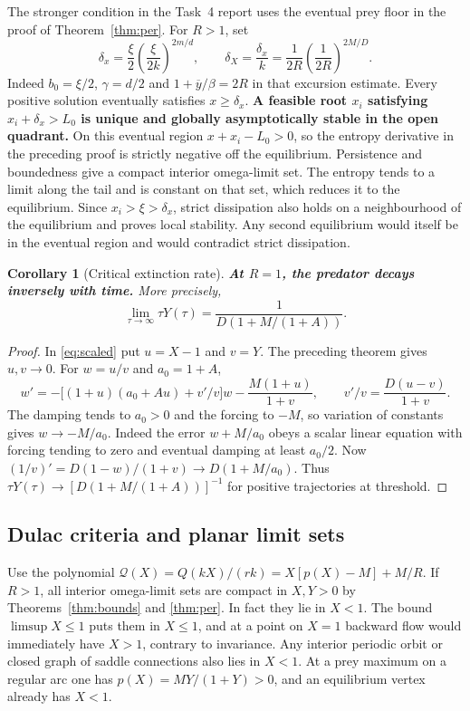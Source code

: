 \documentclass[12pt,a4paper,twoside,fleqn]{article}
\theoremstyle{journal}
\newtheorem{corollary}{Corollary}
\newcommand{\claim}[1]{{\normalfont\bfseries\boldmath #1}}
\newcommand{\Q}{\mathcal Q}
\begin{document}
The stronger condition in the Task~4 report uses the eventual prey floor in the proof of Theorem~\ref{thm:per}. For \(R>1\), set
\begin{equation}\label{eq:floorentropy}
 \delta_x=\frac{\xi}{2}\left(\frac{\xi}{2k}\right)^{2m/d},
 \qquad \delta_X=\frac{\delta_x}{k}
       =\frac{1}{2R}\left(\frac{1}{2R}\right)^{2M/D}.
\end{equation}
Indeed \(b_0=\xi/2\), \(\gamma=d/2\) and \(1+\overline y/\beta=2R\) in that excursion estimate. Every positive solution eventually satisfies \(x\ge\delta_x\).
\claim{A feasible root \(x_i\) satisfying \(x_i+\delta_x>L_0\) is unique and globally asymptotically stable in the open quadrant.}
On this eventual region \(x+x_i-L_0>0\), so the entropy derivative in the preceding proof is strictly negative off the equilibrium. Persistence and boundedness give a compact interior omega-limit set. The entropy tends to a limit along the tail and is constant on that set, which reduces it to the equilibrium. Since \(x_i>\xi>\delta_x\), strict dissipation also holds on a neighbourhood of the equilibrium and proves local stability. Any second equilibrium would itself be in the eventual region and would contradict strict dissipation.

\begin{corollary}[Critical extinction rate]\label{cor:rate}
\claim{At \(R=1\), the predator decays inversely with time.} More precisely,
\[
 \lim_{\tau\to\infty}\tau Y(\tau)
   =\frac{1}{D(1+M/(1+A))}.
\]
\end{corollary}
\begin{proof} In \eqref{eq:scaled} put \(u=X-1\) and \(v=Y\). The preceding theorem gives \(u,v\to0\). For \(w=u/v\) and \(a_0=1+A\),
\[
 w'=-\big[(1+u)(a_0+Au)+v'/v\big]w-\frac{M(1+u)}{1+v},
 \qquad v'/v=\frac{D(u-v)}{1+v}.
\]
The damping tends to \(a_0>0\) and the forcing to \(-M\), so variation of constants gives \(w\to-M/a_0\). Indeed the error \(w+M/a_0\) obeys a scalar linear equation with forcing tending to zero and eventual damping at least \(a_0/2\). Now \((1/v)'=D(1-w)/(1+v)\to D(1+M/a_0)\). Thus \(\tau Y(\tau)\to[D(1+M/(1+A))]^{-1}\) for positive trajectories at threshold.

\end{proof}

\subsection{Dulac criteria and planar limit sets}
Use the polynomial \(\Q(X)=Q(kX)/(rk)=X[p(X)-M]+M/R\). If \(R>1\), all interior omega-limit sets are compact in \(X,Y>0\) by Theorems~\ref{thm:bounds} and \ref{thm:per}. In fact they lie in \(X<1\). The bound \(\limsup X\le1\) puts them in \(X\le1\), and at a point on \(X=1\) backward flow would immediately have \(X>1\), contrary to invariance. Any interior periodic orbit or closed graph of saddle connections also lies in \(X<1\). At a prey maximum on a regular arc one has \(p(X)=MY/(1+Y)>0\), and an equilibrium vertex already has \(X<1\).
\end{document}

